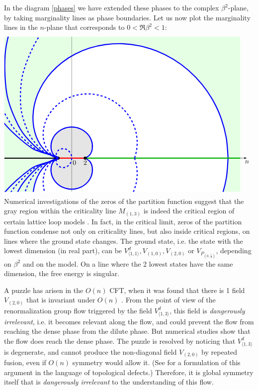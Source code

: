 \documentclass[12pt, a4paper]{article}
\begin{document}
In the diagram \eqref{phases} we have extended these phases to the complex $\beta^2$-plane, by taking marginality lines as phase boundaries. Let us now plot the marginality lines in the $n$-plane that corresponds to $0<\Re \beta^2<1$:
\newcommand{\margs}[2]{
\draw[domain = {-2/(#1-1)}:{2/(#1-1)}, smooth, variable = \t, #2]
plot({-2*cos(pi/2*(#1-1)*\t r)*cosh(pi/2*(#1-1)*sqrt(abs(\t)-\t*\t)}, {2*sin(pi/2*(#1-1)*\t r)*sinh(pi/2*(#1-1)*sqrt(abs(\t)-\t*\t)});
}
\begin{align}
 \begin{tikzpicture}[baseline=(current  bounding  box.center), scale = .35]
\clip (-10, 18) -- (27, 18) -- (27, -5) -- (-10, -5) -- cycle;
\fill [color = green!10] (-10, 18) -- (25, 18) -- (25, -5) -- (-10, -5) -- cycle;
\margs{5}{ultra thick, blue, samples = 50, fill = white}
\margs{3}{ultra thick, blue, fill = black!10}
\draw[-latex] (-10, 0) -- (26, 0) node[below]{$n$};
\draw (0, -5) -- (0, 18);
\draw[ultra thick, green!70!black] (2, 0) -- (25, 0);
\draw [ultra thick] (-10, 0) -- (-2, 0);
\draw [ultra thick, red] (-2, 0) -- (2, 0); 
\node[below right] at (-.2, 0) {$0$};
\node[below] at (2, 0) {$2$};
\node at (2, 0) [fill, circle, scale = .5] {};
\node at (-2, 0) [fill, circle, scale = .5] {};
 \draw[domain = 0:360, smooth, variable = \t, samples = 30, ultra thick, dashed, blue]
   plot({-2*sin(pi*(1+cos(\t))/4 r)*cosh(pi*sin(\t)/4)}, {2*cos(pi*(1+cos(\t))/4 r)*sinh(pi*sin(\t)/4)});
 \margs{4}{ultra thick, dashed, blue, samples = 50}
\margs{6}{ultra thick, dashed, blue}
\margs{7}{ultra thick, blue}
\margs{8}{ultra thick, dashed, blue}
\margs{9}{ultra thick, blue}
\end{tikzpicture}
\end{align}
Numerical investigations of the zeros of the partition function suggest that the gray region within the criticality line $M_{(1,3)}$ is indeed the critical region of certain lattice loop models \cite{bjjz22}. 
In fact, in the critical limit, zeros of the partition function condense not only on criticality lines, but also inside critical regions, on lines where the ground state changes. The ground state, i.e. the state with the lowest dimension (in real part), can be $V^d_{\langle 1,1\rangle}, V_{(1, 0)}, V_{(2,0)}$ or $V_{P_{(0,\frac12)}}$, depending on $\beta^2$ and on the model. On a line where the 2 lowest states have the same dimension, the free energy is singular. 

A puzzle has arisen in the $O(n)$ CFT, when it was found that there is 1 field $V_{(2,0)}$ that is invariant under $O(n)$ \cite{gz20}. From the point of view of the renormalization group flow triggered by the field $V^d_{\langle 1,3\rangle}$, this field is \textit{dangerously irrelevant}, i.e. it becomes relevant along the flow, and could prevent the flow from reaching the dense phase from the dilute phase. But numerical studies show that the flow does reach the dense phase. The puzzle is resolved by noticing that $V^d_{\langle 1,3\rangle}$ is degenerate, and cannot produce the non-diagonal field $V_{(2,0)}$ by repeated fusion, even if $O(n)$ symmetry would allow it. (See \cite{js23} for a formulation of this argument in the language of topological defects.) Therefore, it is global symmetry itself that is \textit{dangerously irrelevant} to the understanding of this flow.
\end{document}

